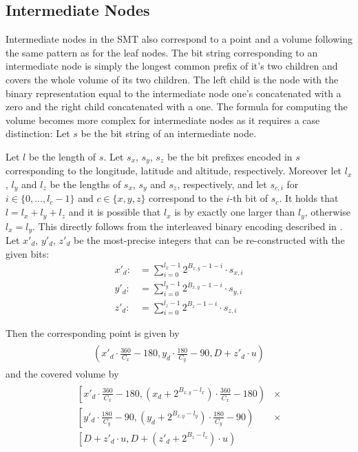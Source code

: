 \documentclass[10pt,conference,compsocconf]{IEEEtran}
\begin{document}
\subsection{Intermediate Nodes}
\label{sec:data-structure:intermediate}
Intermediate nodes in the SMT also correspond to a point and a volume following the same pattern as for the leaf nodes.
The bit string corresponding to an intermediate node is simply the longest common prefix of it's two children and covers the whole volume of its two children.
The left child is the node with the binary representation equal to the intermediate node one's concatenated with a zero and the right child concatenated with a one.
The formula for computing the volume becomes more complex for intermediate nodes as it requires a case distinction:
Let $s$ be the bit string of an intermediate node.

Let $l$ be the length of $s$.
Let $s_x$, $s_y$, $s_z$ be the bit prefixes encoded in $s$ corresponding to the longitude, latitude and altitude, respectively.
Moreover let $l_x$, $l_y$ and $l_z$ be the lengths of $s_x$, $s_y$ and $s_z$, respectively, and let $s_{c,i}$ for $i \in \{0, ..., l_c-1\}$ and $c \in \{x, y, z\}$ correspond to the $i$-th bit of $s_c$.
It holds that $l = l_x + l_y + l_z$ and it is possible that $l_x$ is by exactly one larger than $l_y$, otherwise $l_x = l_y$.
This directly follows from the interleaved binary encoding described in .
Let $x'_d$, $y'_d$, $z'_d$ be the most-precise integers that can be re-constructed with the given bits:
\begin{align}
	\label{eq:intermediate-geometric-point-partial-height:x}
	x'_d :&= \sum_{i=0}^{l_x - 1} 2^{B_{x,y} - 1 - i} \cdot s_{x,i}\\
	\label{eq:intermediate-geometric-point-partial-height:y}
	y'_d :&= \sum_{i=0}^{l_y - 1} 2^{B_{x,y} - 1 - i} \cdot s_{y,i}\\
	\label{eq:intermediate-geometric-point-partial-height:z}
	z'_d :&= \sum_{i=0}^{l_z - 1} 2^{B_{z} - 1 - i} \cdot s_{z,i}
\end{align}

Then the corresponding point is given by
\begin{align}
\begin{split}
\label{eq:intermediate-geometric-point-partial-height}
\left(x'_d \cdot \frac{360}{C_x} - 180,y_d \cdot \frac{180}{C_y} - 90, D + z'_d \cdot u\right)
\end{split}
\end{align}
and the covered volume by
\begin{align}
\begin{split}
\label{eq:intermediate-geometric-volume-full-height}
\left[x'_d \cdot \frac{360}{C_x} - 180, (x_d + 2^{B_{x,y} - l_x}) \cdot \frac{360}{C_x} - 180\right) &\times\\
\left[y'_d \cdot \frac{180}{C_y} - 90, (y_d + 2^{B_{x,y} - l_y}) \cdot \frac{180}{C_y} - 90\right) &\times\\
\left[D + z'_d \cdot u, D + \left(z'_d + 2^{B_z - l_z}\right) \cdot u\right)&
\end{split}
\end{align}
\end{document}
